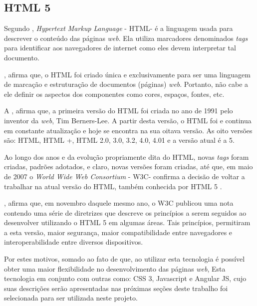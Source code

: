 \subsection{HTML 5}

Segundo , \textit{Hypertext Markup Language}  - HTML\footnotemark[26] - é a linguagem usada para descrever o conteúdo das páginas \textit{web}. Ela utiliza marcadores denominados \textit{tags} para identificar aos navegadores de internet como eles devem interpretar tal documento.


, afirma que, o HTML foi criado única e exclusivamente para ser uma linguagem de marcação e estruturação de documentos (páginas) \textit{web}. Portanto, não cabe a ele definir os aspectos dos componentes como cores, espaços, fontes, etc.

A , afirma que, a primeira versão do HTML foi criada no ano de 1991 pelo inventor da \textit{web}, Tim Berners-Lee. A partir desta versão, o HTML foi e continua em constante atualização e hoje se encontra na sua oitava versão. As oito versões são: HTML, HTML +, HTML 2.0, 3.0, 3.2, 4.0, 4.01 e a versão atual é a 5.

Ao longo dos anos e da evolução propriamente dita do HTML, novas \textit{tags} foram criadas, padrões adotados, e claro, novas versões foram criadas, até que, em maio de 2007  o \textit{World Wide Web Consortium} - W3C\footnotemark[27] - confirma a decisão de voltar a trabalhar na atual versão do HTML, também conhecida por HTML 5 \cite{w3c_html_fundamentals}.


, afirma que, em novembro daquele mesmo ano, o W3C publicou uma nota contendo uma série de diretrizes que descreve os princípios a serem seguidos ao desenvolver utilizando o HTML 5 em algumas áreas. Tais princípios, permitiram a esta versão, maior segurança, maior compatibilidade entre navegadores e interoperabilidade entre diversos dispositivos.

Por estes motivos, somado ao fato de que, ao utilizar esta tecnologia é possível obter uma maior flexibilidade no desenvolvimento das páginas \textit{web}, Esta tecnologia em conjunto com outras como: CSS 3, Javascript e Angular JS, cujo suas descrições serão apresentadas nas próximas seções deste trabalho foi selecionada para ser utilizada neste projeto.